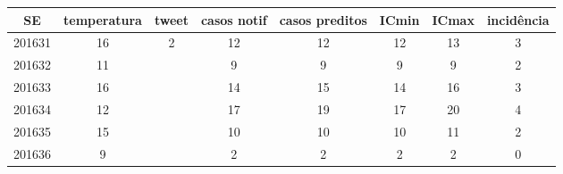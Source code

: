 \begin{tabular}{c|ccccccc}
  \hline
SE & temperatura & tweet & casos notif & casos preditos & ICmin & ICmax & incidência \\ 
  \hline
201631 & 16 & 2 & 12 & 12 & 12 & 13 & 3 \\ 
  201632 & 11 &  & 9 & 9 & 9 & 9 & 2 \\ 
  201633 & 16 &  & 14 & 15 & 14 & 16 & 3 \\ 
  201634 & 12 &  & 17 & 19 & 17 & 20 & 4 \\ 
  201635 & 15 &  & 10 & 10 & 10 & 11 & 2 \\ 
  201636 & 9 &  & 2 & 2 & 2 & 2 & 0 \\ 
   \hline
\end{tabular}
